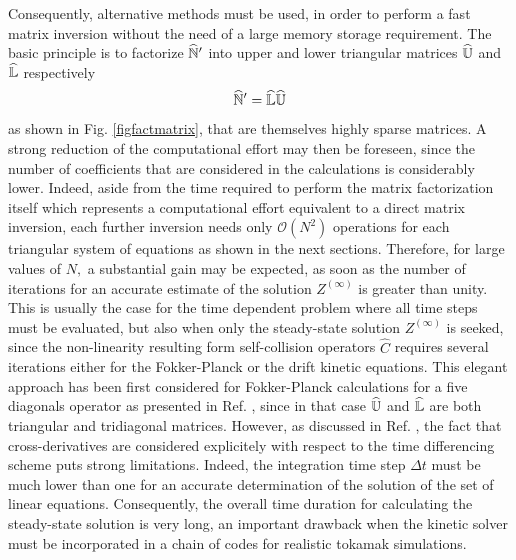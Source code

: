 Consequently, alternative methods must be used, in order to perform a fast
matrix inversion without the need of a large memory storage requirement. The
basic principle is to factorize $\widehat{\Bbb{N}}^{\prime }$ into upper and
lower triangular matrices $\widehat{\Bbb{U}}$ and $\widehat{\Bbb{L}}$
respectively
\begin{equation}
\widehat{\Bbb{N}}^{\prime }=\widehat{\Bbb{L}}\widehat{\Bbb{U}}
\end{equation}
as shown in Fig. \ref{figfactmatrix}, that are themselves highly sparse
matrices. A strong reduction of the computational effort may then be
foreseen, since the number of coefficients that are considered in the
calculations is considerably lower. Indeed, aside from the time required to
perform the matrix factorization itself which represents a computational
effort equivalent to a direct matrix inversion, each further inversion needs
only $\mathcal{O}\left( N^{2}\right) $ operations for each triangular system
of equations as shown in the next sections. Therefore, for large values of $%
N,$ a substantial gain may be expected, as soon as the number of iterations
for an accurate estimate of the solution $Z^{(\infty )}$ is greater than
unity. This is usually the case for the time dependent problem where all
time steps must be evaluated, but also when only the steady-state solution $%
Z^{(\infty )}$ is seeked, since the non-linearity resulting form
self-collision operators $\widehat{C}$ requires several iterations either
for the Fokker-Planck or the drift kinetic equations. This elegant approach
has been first considered for Fokker-Planck calculations for a five
diagonals operator as presented in Ref. \cite{sho94}, since in that case $%
\widehat{\Bbb{U}}$ and $\widehat{\Bbb{L}}$ are both triangular and
tridiagonal matrices. However, as discussed in Ref. \cite{pey98}, the fact
that cross-derivatives are considered explicitely with respect to the time
differencing scheme puts strong limitations. Indeed, the integration time
step $\Delta t$ must be much lower than one for an accurate determination of
the solution of the set of linear equations. Consequently, the overall time
duration for calculating the steady-state solution is very long, an
important drawback when the kinetic solver must be incorporated in a chain
of codes for realistic tokamak simulations.


